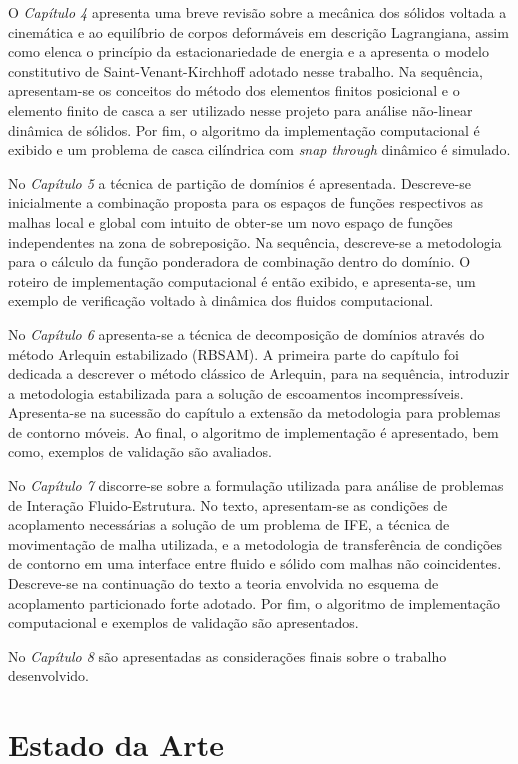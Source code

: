 \documentclass[tese_patricia.tex]{subfiles}
\begin{document}
O \textit{Capítulo 4} apresenta uma breve revisão sobre a mecânica dos sólidos voltada a cinemática e ao equilíbrio de corpos deformáveis em descrição Lagrangiana, assim como elenca o princípio da estacionariedade de energia e a apresenta o modelo constitutivo de Saint-Venant-Kirchhoff adotado nesse trabalho. Na sequência, apresentam-se os conceitos do método dos elementos finitos posicional e o elemento finito de casca a ser utilizado nesse projeto para análise não-linear dinâmica de sólidos. Por fim, o algoritmo da implementação computacional é exibido e um problema de casca cilíndrica com \textit{snap through} dinâmico é simulado.

No \textit{Capítulo 5} a técnica de partição de domínios é apresentada.  Descreve-se inicialmente a combinação proposta para os espaços de funções respectivos as malhas local e global com intuito de obter-se um novo espaço de funções independentes na zona de sobreposição. Na sequência, descreve-se a metodologia para o cálculo da função ponderadora de combinação dentro do domínio.
O roteiro de implementação computacional é então exibido, e apresenta-se, um exemplo de verificação voltado à dinâmica dos fluidos computacional.

No \textit{Capítulo 6} apresenta-se a técnica de decomposição de domínios através do método Arlequin estabilizado (RBSAM). A primeira parte do capítulo foi dedicada a descrever o método clássico de Arlequin, para na sequência, introduzir a metodologia estabilizada para a solução de escoamentos incompressíveis. Apresenta-se na sucessão do capítulo a extensão da metodologia para problemas de contorno móveis. Ao final, o algoritmo de implementação é apresentado, bem como, exemplos de validação são avaliados.

No \textit{Capítulo 7} discorre-se sobre a formulação utilizada para análise de problemas de Interação Fluido-Estrutura. No texto, apresentam-se as condições de acoplamento necessárias a solução de um problema de IFE, a técnica de movimentação de malha utilizada, e a metodologia de transferência de condições de contorno em uma interface entre fluido e sólido com malhas não coincidentes. Descreve-se na continuação do texto a teoria envolvida no esquema de acoplamento particionado forte adotado. Por fim, o algoritmo de implementação computacional e exemplos de validação são apresentados.

No \textit{Capítulo 8} são apresentadas as considerações finais sobre o trabalho desenvolvido. 

\section[Estado da Arte]{Estado da Arte}\label{section:estado_da_arte}
\end{document}
